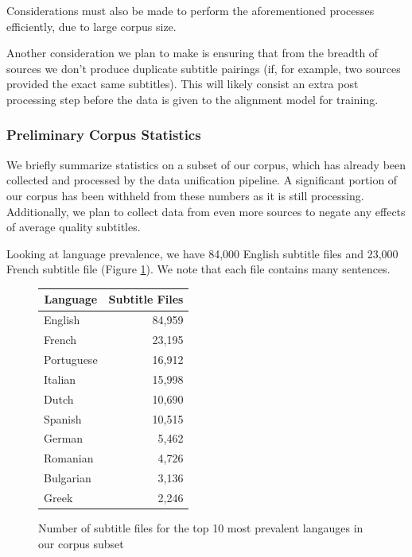 \documentclass[twoside,twocolumn]{article}
\begin{document}
Considerations must also be made to perform the aforementioned processes
efficiently, due to large corpus size.

Another consideration we plan to make is ensuring that from the breadth of
sources we don't produce duplicate subtitle pairings (if, for example, two
sources provided the exact same subtitles). This will likely consist an
extra post processing step before the data is given to the alignment model for
training.


\subsubsection{Preliminary Corpus Statistics}

We briefly summarize statistics on a subset of our corpus, which has already
been collected and processed by the data unification pipeline. A
significant portion of our corpus has been withheld from these numbers as it
is still processing. Additionally, we plan to collect data from even more
sources to negate any effects of average quality subtitles.

Looking at language prevalence, we have 84,000 English subtitle files and
23,000 French subtitle file (Figure \ref{fig:language-prevalence}). We note
that each file contains many sentences.

\begin{figure}[ht]
    \centering
    \begin{tabular}{ |l|r| }
        \hline
        \multicolumn{1}{|c|}{\textbf{Language}} &
            \multicolumn{1}{|c|}{\textbf{Subtitle Files}} \\
        \hline
        English    & 84,959 \\  \hline
        French     & 23,195 \\  \hline
        Portuguese & 16,912 \\  \hline
        Italian    & 15,998 \\  \hline
        Dutch      & 10,690 \\  \hline
        Spanish    & 10,515 \\  \hline
        German     & 5,462  \\  \hline
        Romanian   & 4,726  \\  \hline
        Bulgarian  & 3,136  \\  \hline
        Greek      & 2,246  \\  \hline
    \end{tabular}

    \caption{Number of subtitle files for the top 10 most prevalent langauges
             in our corpus subset}
    \label{fig:language-prevalence}
\end{figure}
\end{document}
